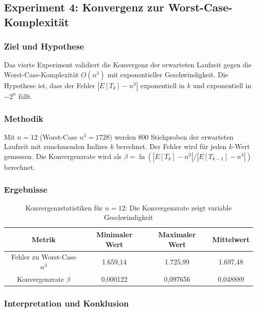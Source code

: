 ﻿\documentclass[a4paper,12pt]{article}
\theoremstyle{definition}
\begin{document}

\subsection{Experiment 4: Konvergenz zur Worst-Case-Komplexität}
\label{exp:konvergenz}

\subsubsection{Ziel und Hypothese}

Das vierte Experiment validiert die Konvergenz der erwarteten Laufzeit gegen die Worst-Case-Komplexität $O(n^3)$ mit exponentieller Geschwindigkeit. Die Hypothese ist, dass der Fehler $|E[T_k] - n^3|$ exponentiell in $k$ und exponentiell in $-2^n$ fällt.

\subsubsection{Methodik}

Mit $n = 12$ (Worst-Case $n^3 = 1728$) werden 800 Stichproben der erwarteten Laufzeit mit zunehmenden Indizes $k$ berechnet. Der Fehler wird für jeden $k$-Wert gemessen. Die Konvergenzrate wird als $\beta = \ln(|E[T_k] - n^3| / |E[T_{k-1}] - n^3|)$ berechnet.

\subsubsection{Ergebnisse}

\begin{table}[h]
	\centering
	\begin{tabular}{|c|c|c|c|}
		\hline
		\textbf{Metrik} & \textbf{Minimaler Wert} & \textbf{Maximaler Wert} & \textbf{Mittelwert} \\
		\hline
		Fehler zu Worst-Case $n^3$ & 1.659,14 & 1.725,99 & 1.697,48 \\
		\hline
		Konvergenzrate $\beta$ & 0,000122 & 0,097656 & 0,048889 \\
		\hline
	\end{tabular}
	\caption{Konvergenzstatistiken für $n=12$: Die Konvergenzrate zeigt variable Geschwindigkeit}
	\label{tab:exp04_convergence}
\end{table}

\subsubsection{Interpretation und Konklusion}
\end{document}
